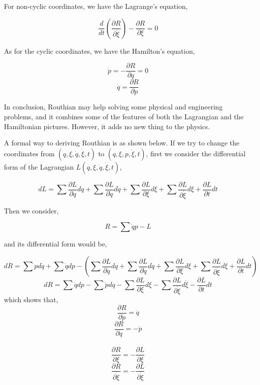 \documentclass[12pt]{article}
\numberwithin{equation}{section}
\begin{document}
For non-cyclic coordinates, we have the Lagrange's equation,

\begin{center}
    \[ \frac{d}{dt} \left( \frac{\partial R}{\partial \dot{\xi}} \right) - \frac{\partial R}{\partial \xi} = 0 \]
\end{center}

As for the cyclic coordinates, we have the Hamilton's equation,

\begin{center}
    \[ \dot{p} = -\frac{\partial R}{\partial q} = 0\]
    \[ \dot{q} = \frac{\partial R}{\partial p}\]
\end{center}

In conclusion, Routhian may help solving some physical and engineering problems, and it combines some of the features of both the Lagrangian and the Hamiltonian pictures. However, it adds no new thing to the physics.

A formal way to deriving Routhian is as shown below.
If we try to change the coordinates from $(q, \xi, \dot{q}, \dot{\xi}, t)$ to $(q, \xi, p, \dot{\xi}, t)$, first we consider the differential form of the Lagrangian $L(q, \xi, \dot{q}, \dot{\xi}, t)$,

\begin{center}
    \[ dL = \sum{\frac{\partial L}{\partial q} dq} + \sum{\frac{\partial L}{\partial \dot{q}} d\dot{q}} + \sum{\frac{\partial L}{\partial \xi} d\xi} + \sum{\frac{\partial L}{\partial \dot{\xi}} d\xi} + \frac{\partial L}{\partial t}dt \]
\end{center}

Then we consider,

\begin{center}
    \[ R = \sum{\dot{q}p} - L \]
\end{center}

and its differential form would be,

\begin{center}
    \[ dR = \sum{pd\dot{q}} + \sum{\dot{q}dp} - \left(\sum{\frac{\partial L}{\partial q} dq} + \sum{\frac{\partial L}{\partial \dot{q}} d\dot{q}} + \sum{\frac{\partial L}{\partial \xi} d\xi} + \sum{\frac{\partial L}{\partial \dot{\xi}} d\xi} + \frac{\partial L}{\partial t}dt \right) \]
    \[ dR = \sum{\dot{q}dp} - \sum{\dot{p}dq} - \sum{\frac{\partial L}{\partial \xi}d\xi} - \sum{\frac{\partial L}{\partial \dot{\xi}}d\dot{\xi}} - \frac{\partial L}{\partial t}dt \]
    which shows that,
    \[ \frac{\partial R}{\partial p} = \dot{q} \]
    \[ \frac{\partial R}{\partial q} = - \dot{p} \]\\
    \[ \frac{\partial R}{\partial \xi} = -\frac{\partial L}{\partial \xi} \]
    \[ \frac{\partial R}{\partial \dot{\xi}} = - \frac{\partial L}{\partial \dot{\xi}} \]
\end{center}
\end{document}
